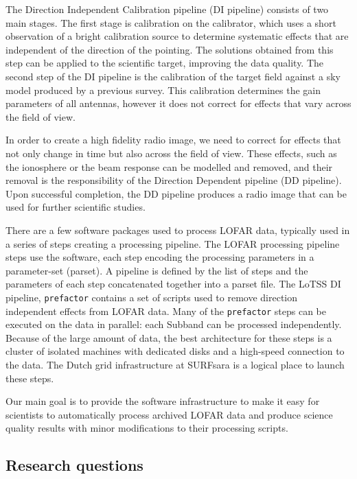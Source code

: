 The Direction Independent Calibration pipeline (DI pipeline) consists of two main stages. The first stage is calibration on the calibrator, which uses a short observation of a bright calibration source to determine systematic effects that are independent of the direction of the pointing. The solutions obtained from this step can be applied to the scientific target, improving the data quality. The second step of the DI pipeline is the calibration of the target field against a sky model produced by a previous survey. This calibration determines the gain parameters of all antennas, however it does not correct for effects that vary across the field of view. 
 
In order to create a high fidelity radio image, we need to correct for effects that not only change in time but also across the field of view. These effects, such as the ionosphere or the beam response can be modelled and removed, and their removal is the responsibility of the Direction Dependent pipeline (DD pipeline). Upon successful completion, the DD pipeline produces a radio image that can be used for further scientific studies.

There are a few software packages used to process LOFAR data, typically used in a series of steps creating a processing pipeline. The LOFAR processing pipeline steps use the software, each step encoding the processing parameters in a parameter-set (parset). A pipeline is defined by the list of steps and the parameters of each step concatenated together into a parset file. The LoTSS DI pipeline, \texttt{prefactor} contains a set of scripts used to remove direction independent effects from LOFAR data. Many of the \texttt{prefactor} steps can be executed on the data in parallel: each Subband can be processed independently. Because of the large amount of data, the best architecture for these steps is a cluster of isolated machines with dedicated disks and a high-speed connection to the data. The Dutch grid infrastructure at SURFsara is a logical place to launch these steps. 

Our main goal is to provide the software infrastructure to make it easy for scientists to automatically process archived LOFAR data and produce science quality results with minor modifications to their processing scripts.

\subsection{Research questions}

